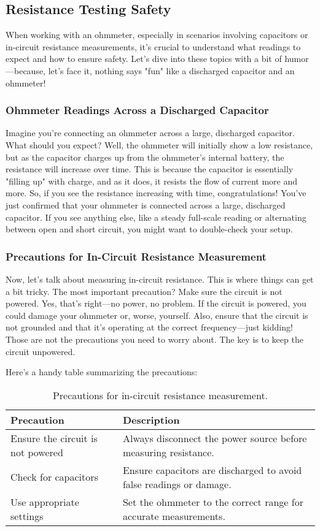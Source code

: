 \subsection{Resistance Testing Safety}
\label{subsec:resistance-testing}

When working with an ohmmeter, especially in scenarios involving capacitors or in-circuit resistance measurements, it's crucial to understand what readings to expect and how to ensure safety. Let's dive into these topics with a bit of humor—because, let's face it, nothing says "fun" like a discharged capacitor and an ohmmeter!

\subsubsection*{Ohmmeter Readings Across a Discharged Capacitor}
Imagine you're connecting an ohmmeter across a large, discharged capacitor. What should you expect? Well, the ohmmeter will initially show a low resistance, but as the capacitor charges up from the ohmmeter's internal battery, the resistance will increase over time. This is because the capacitor is essentially "filling up" with charge, and as it does, it resists the flow of current more and more. So, if you see the resistance increasing with time, congratulations! You've just confirmed that your ohmmeter is connected across a large, discharged capacitor. If you see anything else, like a steady full-scale reading or alternating between open and short circuit, you might want to double-check your setup.

\subsubsection*{Precautions for In-Circuit Resistance Measurement}
Now, let's talk about measuring in-circuit resistance. This is where things can get a bit tricky. The most important precaution? Make sure the circuit is not powered. Yes, that's right—no power, no problem. If the circuit is powered, you could damage your ohmmeter or, worse, yourself. Also, ensure that the circuit is not grounded and that it's operating at the correct frequency—just kidding! Those are not the precautions you need to worry about. The key is to keep the circuit unpowered. 

Here’s a handy table summarizing the precautions:

\begin{table}[h]
\centering
\caption{Precautions for in-circuit resistance measurement.}
\label{tab:resistance-precautions}
\begin{tabular}{|l|p{8cm}|}
\hline
\textbf{Precaution} & \textbf{Description} \\ \hline
Ensure the circuit is not powered & Always disconnect the power source before measuring resistance. \\ \hline
Check for capacitors & Ensure capacitors are discharged to avoid false readings or damage. \\ \hline
Use appropriate settings & Set the ohmmeter to the correct range for accurate measurements. \\ \hline
\end{tabular}
\end{table}

